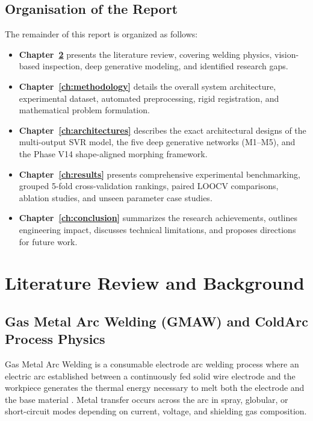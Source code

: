 \documentclass[12pt,a4paper,oneside]{report}
\begin{document}
\section{Organisation of the Report}
The remainder of this report is organized as follows:
\begin{itemize}
    \item \textbf{Chapter~\ref{ch:literature}} presents the literature review, covering welding physics, vision-based inspection, deep generative modeling, and identified research gaps.
    \item \textbf{Chapter~\ref{ch:methodology}} details the overall system architecture, experimental dataset, automated preprocessing, rigid registration, and mathematical problem formulation.
    \item \textbf{Chapter~\ref{ch:architectures}} describes the exact architectural designs of the multi-output SVR model, the five deep generative networks (M1--M5), and the Phase V14 shape-aligned morphing framework.
    \item \textbf{Chapter~\ref{ch:results}} presents comprehensive experimental benchmarking, grouped 5-fold cross-validation rankings, paired LOOCV comparisons, ablation studies, and unseen parameter case studies.
    \item \textbf{Chapter~\ref{ch:conclusion}} summarizes the research achievements, outlines engineering impact, discusses technical limitations, and proposes directions for future work.
\end{itemize}

\chapter{Literature Review and Background}
\label{ch:literature}

\section{Gas Metal Arc Welding (GMAW) and ColdArc Process Physics}
Gas Metal Arc Welding is a consumable electrode arc welding process where an electric arc established between a continuously fed solid wire electrode and the workpiece generates the thermal energy necessary to melt both the electrode and the base material \cite{gmaw}. Metal transfer occurs across the arc in spray, globular, or short-circuit modes depending on current, voltage, and shielding gas composition. 
\end{document}
